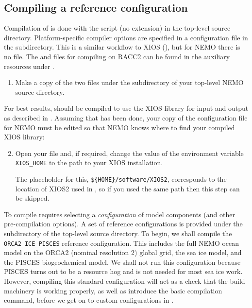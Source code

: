 \subsection{Compiling a reference configuration}
\label{sec:tutor-reference}

Compilation of \NEMOSIcu{} is done with the script  (no extension) in the top-level source directory.
Platform-specific compiler options are specified in a configuration file in the  subdirectory.
This is a similar workflow to XIOS (), but for NEMO there is no  file.
The  and  files for compiling on RACC2 can be found in the auxiliary resources under .

\begin{enumerate}
    \item Make a copy of the two files under the  subdirectory of your top-level NEMO source directory.
\end{enumerate}

For best results, \NEMOSIcu{} should be compiled to use the XIOS library for input and output as described in .
Assuming that has been done, your copy of the configuration file for NEMO must be edited so that NEMO knows where to find your compiled XIOS library:

\begin{enumerate}\setcounter{enumi}{1}
    \item Open your  file and, if required, change the value of the environment variable \texttt{XIOS_HOME} to the path to your XIOS installation.

    The placeholder for this, \texttt{\$\{HOME\}/software/XIOS2}, corresponds to the location of XIOS2 used in , so if you used the same path then this step can be skipped.
\end{enumerate}

To compile \NEMOSIcu{} requires selecting a \textit{configuration} of model components (and other pre-compilation options).
A set of reference configurations is provided under the  subdirectory of the top-level source directory.
To begin, we shall compile the \texttt{ORCA2_ICE_PISCES} reference configuration.
This includes the full NEMO ocean model on the ORCA2 (nominal resolution 2\textdegree{}) global grid, the \SIcu{} sea ice model, and the PISCES biogeochemical model.
We shall not run this configuration because PISCES turns out to be a resource hog and is not needed for most sea ice work.
However, compiling this standard configuration will act as a check that the build machinery is working properly, as well as introduce the basic compilation command, before we get on to custom configurations in .

